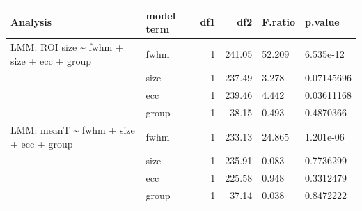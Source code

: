 \begin{table}
\centering
\begin{tabular}{llrrll}
\toprule
Analysis & model term & df1 & df2 & F.ratio & p.value\\
\midrule
LMM: ROI size \textasciitilde{} fwhm + size + ecc + group & fwhm & 1 & 241.05 & 52.209 & 6.535e-12\\
 & size & 1 & 237.49 & 3.278 & 0.07145696\\
 & ecc & 1 & 239.46 & 4.442 & 0.03611168\\
 & group & 1 & 38.15 & 0.493 & 0.4870366\\
LMM: meanT \textasciitilde{} fwhm + size + ecc + group & fwhm & 1 & 233.13 & 24.865 & 1.201e-06\\
\addlinespace
 & size & 1 & 235.91 & 0.083 & 0.7736299\\
 & ecc & 1 & 225.58 & 0.948 & 0.3312479\\
 & group & 1 & 37.14 & 0.038 & 0.8472222\\
\bottomrule
\end{tabular}
\end{table}
